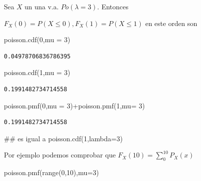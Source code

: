 \documentclass[
  letterpaper,
  DIV=11,
  numbers=noendperiod]{scrreprt}
\newenvironment{Shaded}{\begin{snugshade}}{\end{snugshade}}
\newcommand{\BuiltInTok}[1]{\textcolor[rgb]{0.00,0.23,0.31}{#1}}
\newcommand{\CommentTok}[1]{\textcolor[rgb]{0.37,0.37,0.37}{#1}}
\newcommand{\DecValTok}[1]{\textcolor[rgb]{0.68,0.00,0.00}{#1}}
\newcommand{\NormalTok}[1]{\textcolor[rgb]{0.00,0.23,0.31}{#1}}
\newcommand{\OperatorTok}[1]{\textcolor[rgb]{0.37,0.37,0.37}{#1}}
\begin{document}
Sea \(X\) un una v.a. \(Po(\lambda=3)\). Entonces

\(F_X(0)=P(X\leq 0), F_X(1)=P(X\leq 1)\) en este orden son

\begin{Shaded}
\begin{Highlighting}[]
\NormalTok{poisson.cdf(}\DecValTok{0}\NormalTok{,mu }\OperatorTok{=} \DecValTok{3}\NormalTok{)}
\end{Highlighting}
\end{Shaded}

\begin{verbatim}
0.04978706836786395
\end{verbatim}

\begin{Shaded}
\begin{Highlighting}[]
\NormalTok{poisson.cdf(}\DecValTok{1}\NormalTok{,mu }\OperatorTok{=} \DecValTok{3}\NormalTok{)}
\end{Highlighting}
\end{Shaded}

\begin{verbatim}
0.1991482734714558
\end{verbatim}

\begin{Shaded}
\begin{Highlighting}[]
\NormalTok{poisson.pmf(}\DecValTok{0}\NormalTok{,mu }\OperatorTok{=} \DecValTok{3}\NormalTok{)}\OperatorTok{+}\NormalTok{poisson.pmf(}\DecValTok{1}\NormalTok{,mu}\OperatorTok{=} \DecValTok{3}\NormalTok{) }
\end{Highlighting}
\end{Shaded}

\begin{verbatim}
0.1991482734714558
\end{verbatim}

\begin{Shaded}
\begin{Highlighting}[]
\CommentTok{\#\# es igual a poisson.cdf(1,lambda=3)}
\end{Highlighting}
\end{Shaded}

Por ejemplo podemos comprobar que
\(F_X(10)=\displaystyle\sum_{0}^{10} P_X(x)\)

\begin{Shaded}
\begin{Highlighting}[]
\NormalTok{poisson.pmf(}\BuiltInTok{range}\NormalTok{(}\DecValTok{0}\NormalTok{,}\DecValTok{10}\NormalTok{),mu}\OperatorTok{=}\DecValTok{3}\NormalTok{)}
\end{Highlighting}
\end{Shaded}
\end{document}

